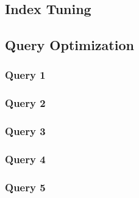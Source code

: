\subsection{Index Tuning}

\subsection{Query Optimization}
\subsubsection{Query 1}
\subsubsection{Query 2}
\subsubsection{Query 3}
\subsubsection{Query 4}
\subsubsection{Query 5}
